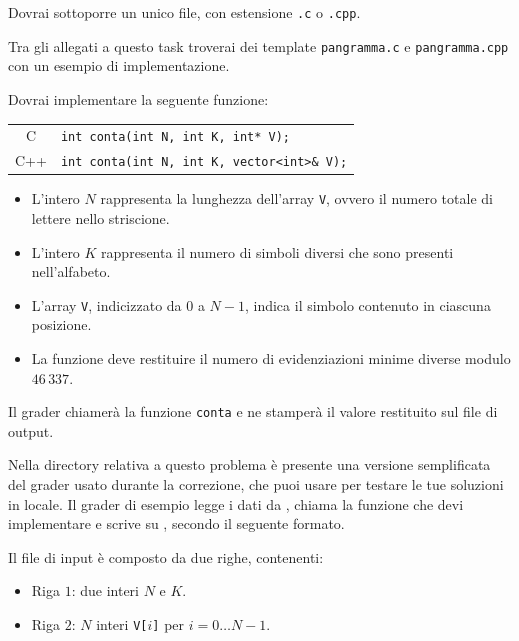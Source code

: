 Dovrai sottoporre un unico file, con estensione \texttt{.c} o \texttt{.cpp}.

\begin{warning}
Tra gli allegati a questo task troverai dei template \texttt{pangramma.c} e
\texttt{pangramma.cpp} con un esempio di implementazione.
\end{warning}

Dovrai implementare la seguente funzione:

\begin{center}\begin{tabularx}{\textwidth}{|c|X|}
\hline
C    & \verb|int conta(int N, int K, int* V);|\\
C++  & \verb|int conta(int N, int K, vector<int>& V);|\\
\hline
\end{tabularx}\end{center}

\begin{itemize}[nolistsep]
  \item L'intero $N$ rappresenta la lunghezza dell'array \texttt{V}, ovvero il
        numero totale di lettere nello striscione.
  \item L'intero $K$ rappresenta il numero di simboli diversi che sono presenti nell'alfabeto.
  \item L'array \texttt{V}, indicizzato da $0$ a $N-1$, indica il simbolo
        contenuto in ciascuna posizione.
  \item La funzione deve restituire il numero di evidenziazioni minime diverse modulo $46\,337$.
\end{itemize}

\medskip

Il grader chiamerà la funzione \texttt{conta} e ne stamperà il valore restituito
sul file di output.



\Grader

Nella directory relativa a questo problema è presente una versione semplificata
del grader usato durante la correzione, che puoi usare per testare le tue
soluzioni in locale. Il grader di esempio legge i dati da , chiama
la funzione che devi implementare e scrive su \outputfile{}, secondo il seguente
formato.

Il file di input è composto da due righe, contenenti:
\begin{itemize}[nolistsep,itemsep=2mm]
\item Riga $1$: due interi $N$ e $K$.
\item Riga $2$: $N$ interi \texttt{V[$i$]} per $i = 0\ldots N-1$.
\end{itemize}

